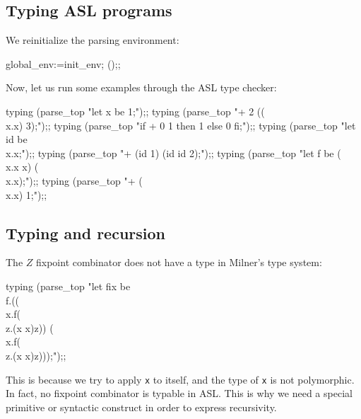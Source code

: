 \subsection{Typing ASL programs}
%

We reinitialize the parsing environment:
\begin{caml_example}
global_env:=init_env; ();;
\end{caml_example}
Now, let us run some examples through the ASL type checker:
\begin{caml_example}
typing (parse_top "let x be 1;");;
typing (parse_top "+ 2 ((\\x.x) 3);");;
typing (parse_top "if + 0 1 then 1 else 0 fi;");;
typing (parse_top "let id be \\x.x;");;
typing (parse_top "+ (id 1) (id id 2);");;
typing (parse_top "let f be (\\x.x x) (\\x.x);");;
typing (parse_top "+ (\\x.x) 1;");;
\end{caml_example}

\subsection{Typing and recursion}
%

The $Z$ fixpoint combinator does not have a type in Milner's type system:
\begin{caml_example}
typing (parse_top
  "let fix be \\f.((\\x.f(\\z.(x x)z)) (\\x.f(\\z.(x x)z)));");;
\end{caml_example}
This is because we try to apply {\tt x} to itself, and the type of {\tt x}
is not polymorphic.
In fact, no fixpoint combinator is typable in ASL.
This is why we need a special primitive or syntactic construct in order
to express recursivity.

